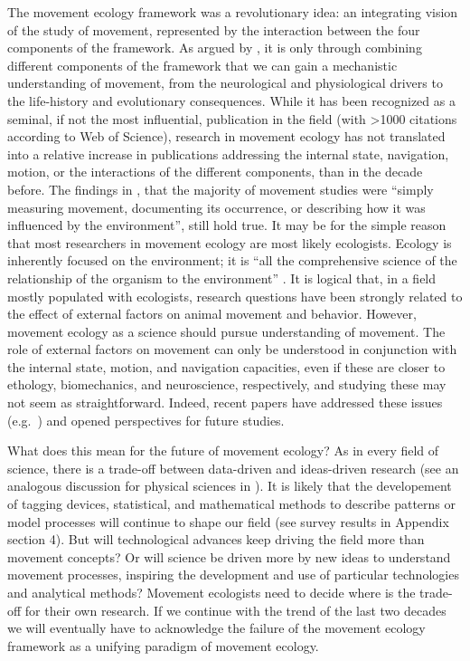 \documentclass[a4paper,12pt]{article}
\begin{document}
The movement ecology framework was a revolutionary idea: an integrating
vision of the study of movement, represented by the interaction between
the four components of the framework. As argued by \cite{Nathan2008}, it is only
through combining different components of the framework that we can gain
a mechanistic understanding of movement, from the neurological and
physiological drivers to the life-history and evolutionary consequences.
While it has been recognized as a seminal, if not the most influential,
publication in the field (with \textgreater1000 citations according to
Web of Science), research in movement ecology has not translated into a
relative increase in publications addressing the internal state,
navigation, motion, or the interactions of the different components,
than in the decade before. The findings in \cite{Holyoak2008}, that the majority of
movement studies were ``simply measuring movement, documenting its
occurrence, or describing how it was influenced by the environment'',
still hold true. It may be for the simple reason that most researchers
in movement ecology are most likely ecologists. Ecology is inherently
focused on the environment; it is ``all the comprehensive science of the
relationship of the organism to the environment'' \cite{Haeckel1866}. It is logical
that, in a field mostly populated with ecologists, research questions
have been strongly related to the effect of external factors on animal
movement and behavior. However, movement ecology as a science should
pursue understanding of movement. The role of external factors on
movement can only be understood in conjunction with the internal state,
motion, and navigation capacities, even if these are closer to ethology,
biomechanics, and neuroscience, respectively, and studying these may not
seem as straightforward. Indeed, recent papers have addressed these
issues (e.g.~\cite{Goossens2020,McMahon2014,Morelle2014}) and opened perspectives for future
studies.

What does this mean for the future of movement ecology? As in every
field of science, there is a trade-off between data-driven and
ideas-driven research (see an analogous discussion for physical sciences
in \cite{Dyson2012}). It is likely that the developement of tagging devices,
statistical, and mathematical methods to describe patterns or model
processes will continue to shape our field (see survey results in
Appendix section 4). But will technological advances keep driving the
field more than movement concepts? Or will science be driven more by new
ideas to understand movement processes, inspiring the development and
use of particular technologies and analytical methods? Movement
ecologists need to decide where is the trade-off for their own research.
If we continue with the trend of the last two decades we will eventually
have to acknowledge the failure of the movement ecology framework as a
unifying paradigm of movement ecology.
\end{document}
